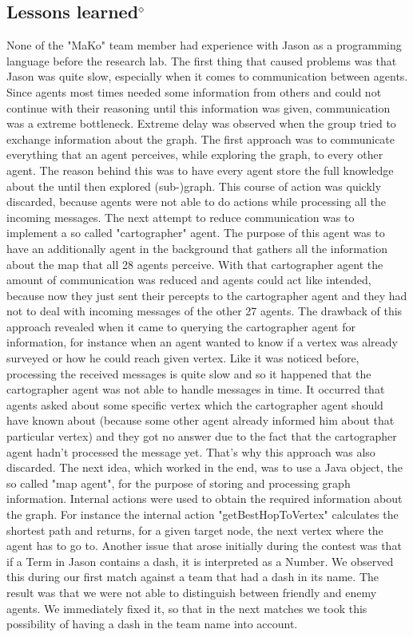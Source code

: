\subsection{Lessons learned$^\diamond$}
None of the "MaKo" team member had experience with Jason as a programming language before the research lab. The first thing that caused problems was that Jason was quite slow, especially when it comes to communication between agents. Since agents most times needed some information from others and could not continue with their reasoning until this information was given, communication was a extreme bottleneck. Extreme delay was observed when the group tried to exchange information about the graph. The first approach was to communicate everything that an agent perceives, while exploring the graph, to every other agent. The reason behind this was to have every agent store the full knowledge about the until then explored (sub-)graph. This course of action was quickly discarded, because agents were not able to do actions while processing all the incoming messages. The next attempt to reduce communication was to implement a so called "cartographer" agent. The purpose of this agent was to have an additionally agent in the background that gathers all the information about the map that all 28 agents perceive. With that cartographer agent the amount of communication was reduced and agents could act like intended, because now they just sent their percepts to the cartographer agent and they had not to deal with incoming messages of the other 27 agents. The drawback of this approach revealed when it came to querying the cartographer agent for information, for instance when an agent wanted to know if a vertex was already surveyed or how he could reach given vertex. Like it was noticed before, processing the received messages is quite slow and so it happened that the cartographer agent was not able to handle messages in time. It occurred that agents asked about some specific vertex which the cartographer agent should have known about (because some other agent already informed him about that particular vertex) and they got no answer due to the fact that the cartographer agent hadn't processed the message yet. That's why this approach was also discarded. The next idea, which worked in the end, was to use a Java object, the so called "map agent", for the purpose of storing and processing graph information. Internal actions were used to obtain the required information about the graph. For instance the internal action "getBestHopToVertex" calculates the shortest path and returns, for a given target node, the next vertex where the agent has to go to.
Another issue that arose initially during the contest was that if a Term in Jason contains a dash, it is interpreted as a Number. We observed this during our first match against a team that had a dash in its name. The result was that we were not able to distinguish between friendly and enemy agents. We immediately fixed it, so that in the next matches we took this possibility of having a dash in the team name into account.

